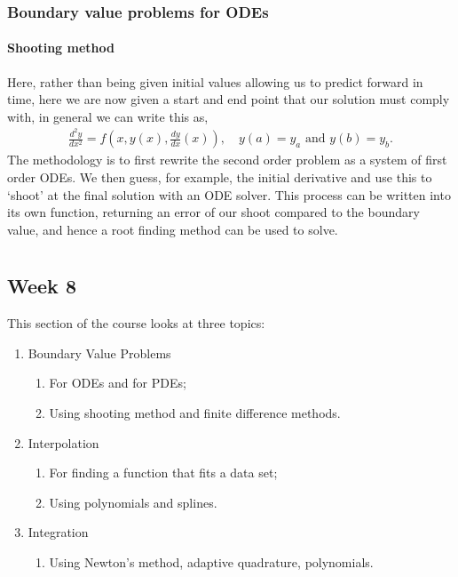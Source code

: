 \documentclass[11pt,a4paper]{report}
\begin{document}
	\subsection{Boundary value problems for ODEs}
		\subsubsection{Shooting method}
			Here, rather than being given initial values allowing us to predict forward in time, here we are now given a start and end point that our solution must comply with, in general we can write this as,
			\begin{align}
				\frac{d^2 y}{dx^2} = f\left(x,y(x), \frac{dy}{dx}(x)\right), \quad y(a) = y_a \text{ and } y(b) = y_b.
			\end{align}
			The methodology is to first rewrite the second order problem as a system of first order ODEs. We then guess, for example, the initial derivative and use this to `shoot' at the final solution with an ODE solver. This process can be written into its own function, returning an error of our shoot compared to the boundary value, and hence a root finding method can be used to solve.
\chapter{}		
\section{Week 8}
	This section of the course looks at three topics:
	\begin{enumerate}
		\item Boundary Value Problems
		\begin{enumerate}
			\item For ODEs and for PDEs;
			\item Using shooting method and finite difference methods.
		\end{enumerate}
		\item Interpolation
		\begin{enumerate}
			\item For finding a function that fits a data set;
			\item Using polynomials and splines.
		\end{enumerate}
		\item Integration
		\begin{enumerate}
			\item Using Newton's method, adaptive quadrature, polynomials.
		\end{enumerate}
	\end{enumerate}
\end{document}
